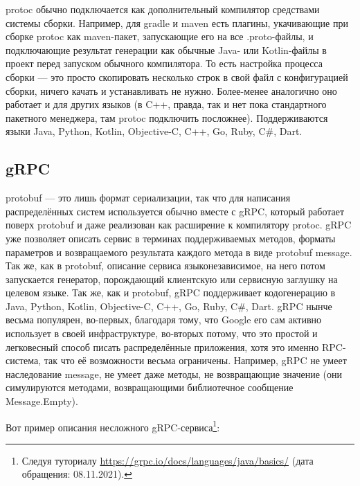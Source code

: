\documentclass{../../text-style}
\begin{document}
protoc обычно подключается как дополнительный компилятор средствами системы сборки. Например, для gradle и maven есть плагины, укачивающие при сборке protoc как maven-пакет, запускающие его на все .proto-файлы, и подключающие результат генерации как обычные Java- или Kotlin-файлы в проект перед запуском обычного компилятора. То есть настройка процесса сборки --- это просто скопировать несколько строк в свой файл с конфигурацией сборки, ничего качать и устанавливать не нужно. Более-менее аналогично оно работает и для других языков (в C++, правда, так и нет пока стандартного пакетного менеджера, там protoc подключить посложнее). Поддерживаются языки Java, Python, Kotlin, Objective-C, C++, Go, Ruby, C\#, Dart.

\subsection{gRPC}

protobuf --- это лишь формат сериализации, так что для написания распределённых систем используется обычно вместе с gRPC, который работает поверх protobuf и даже реализован как расширение к компилятору protoc. gRPC уже позволяет описать сервис в терминах поддерживаемых методов, форматы параметров и возвращаемого результата каждого метода в виде protobuf message. Так же, как в protobuf, описание сервиса языконезависимое, на него потом запускается генератор, порождающий клиентскую или сервисную заглушку на целевом языке. Так же, как и protobuf, gRPC поддерживает кодогенерацию в Java, Python, Kotlin, Objective-C, C++, Go, Ruby, C\#, Dart. gRPC нынче весьма популярен, во-первых, благодаря тому, что Google его сам активно использует в своей инфраструктуре, во-вторых потому, что это простой и легковесный способ писать распределённые приложения, хотя это именно RPC-система, так что её возможности весьма ограничены. Например, gRPC не умеет наследование message, не умеет даже методы, не возвращающие значение (они симулируются методами, возвращающими библиотечное сообщение Message.Empty).

Вот пример описания несложного gRPC-сервиса\footnote{Следуя туториалу \url{https://grpc.io/docs/languages/java/basics/} (дата обращения: 08.11.2021).}:
\end{document}
